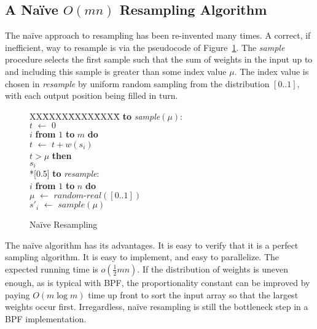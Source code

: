 \documentclass[12pt]{article}
\newcommand{\asgn}{\,\,\leftarrow\,\,}
\newcommand{\newcode}{\\*[0.5\baselineskip]}
\begin{document}
\subsection{A Na\"ive $O(mn)$ Resampling Algorithm}\label{sec-naive}

  The na\"ive approach to resampling has been re-invented
  many times.  A correct, if inefficient, way to resample is
  via the pseudocode of Figure~\ref{fig-omn}.  The {\em
  sample} procedure selects the first sample such that the
  sum of weights in the input up to and including this
  sample is greater than some index value $\mu$.  The index
  value is chosen in {\em resample} by uniform random
  sampling from the distribution $[0..1]$, with each output
  position being filled in turn.

  \begin{figure}
    \centering
    \begin{minipage}{0.6\textwidth}
      \begin{tabbing}
      XX\=XXXX\=XXXX\=XXXX\=\kill
      {\bf to} {\it sample}$(\mu)$: \\
      \>$t \asgn 0$ \\
       $i$ {\bf from} $1$ {\bf to} $m$ {\bf do} \\
      \>\>$t \asgn t + w(s_i)$ \\
      \> $t > \mu$ {\bf then} \\
      \>\> $s_i$ \newcode
      {\bf to} {\it resample}: \\
       $i$ {\bf from} $1$ {\bf to} $n$ {\bf do} \\
      \>\>$\mu \asgn \textit{random-real}([0..1])$ \\
      \>\>$s'_i \asgn sample(\mu)$
      \end{tabbing}
    \end{minipage}
    \caption{Na\"ive Resampling}\label{fig-omn}
  \end{figure}

  The na\"ive algorithm has its advantages.  It is easy to
  verify that it is a perfect sampling algorithm.  It is
  easy to implement, and easy to parallelize.  The expected
  running time is $o(\frac{1}{2}mn)$.  If the distribution
  of weights is uneven enough, as is typical with BPF, the
  proportionality constant can be improved by paying $O(m
  \log m)$ time up front to sort the input array so that the
  largest weights occur first.  Irregardless, na\"ive
  resampling is still the bottleneck step in a BPF
  implementation.
\end{document}
